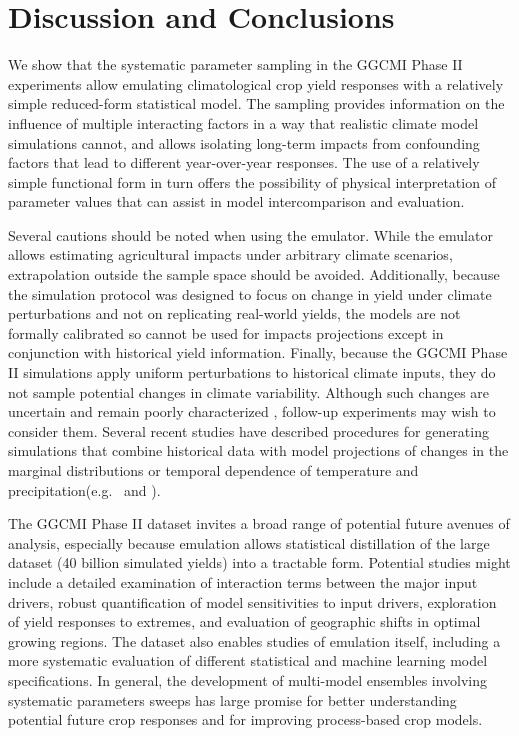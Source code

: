 \documentclass[gmd, manuscript]{copernicus} %
\begin{document}

\section{Discussion and Conclusions} 
\label{S:5}
We show that the systematic parameter sampling in the GGCMI Phase II experiments allow emulating climatological crop yield responses with a relatively simple reduced-form statistical model. 
The sampling provides information on the influence of multiple interacting factors in a way that realistic climate model simulations cannot, and allows isolating long-term impacts from confounding factors that lead to different year-over-year responses. 
The use of a relatively simple functional form in turn offers the possibility of physical interpretation of parameter values that can assist in model intercomparison and evaluation. 

Several cautions should be noted when using the emulator. While the emulator allows estimating agricultural impacts under arbitrary climate scenarios, extrapolation outside the sample space should be avoided. 
Additionally, because the simulation protocol was designed to focus on change in yield under climate perturbations and not on replicating real-world yields, the models are not formally calibrated so cannot be used for impacts projections except in conjunction with historical yield information. 
Finally, because the GGCMI Phase II simulations apply uniform perturbations to historical climate inputs, they do not sample potential changes in climate variability. 
Although such changes are uncertain and remain poorly characterized \citep[e.g.][]{Alexande2006, Kodra2014}, follow-up experiments may wish to consider them. 
Several recent studies have described procedures for generating simulations that combine historical data with model projections of changes in the marginal distributions or temporal dependence of temperature and precipitation(e.g.\ \citet{Leeds2015, poppick2016, Won16} and \citet{Haugen2018}).

The GGCMI Phase II dataset invites a broad range of potential future avenues of analysis, especially because emulation allows statistical distillation of the large dataset (40 billion simulated yields) into a tractable form. 
Potential studies might include a detailed examination of interaction terms between the major input drivers, robust quantification of model sensitivities to input drivers, exploration of yield responses to extremes, and evaluation of geographic shifts in optimal growing regions. 
The dataset also enables studies of emulation itself, including a more systematic evaluation of different statistical and machine learning model specifications.
In general, the development of multi-model ensembles involving systematic parameters sweeps has large promise for better understanding potential future crop responses and for improving process-based crop models.
\end{document}
